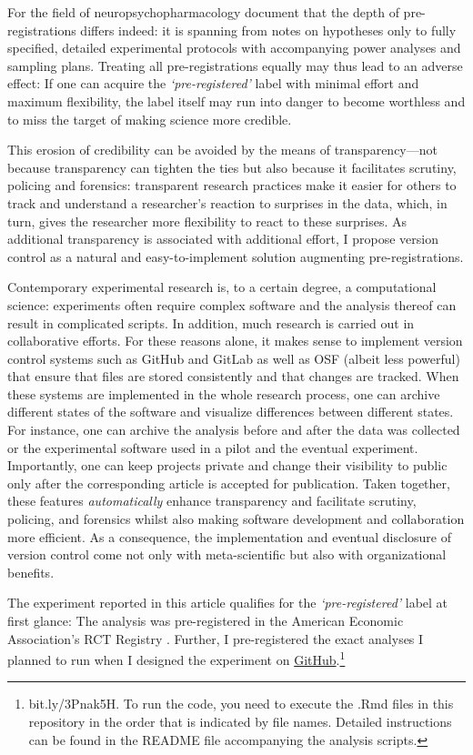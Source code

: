 \documentclass[
  authoryear,
  review,
  3p,
  onecolumn]{elsarticle}
\begin{document}
For the field of neuropsychopharmacology \citet{WaldronAllen2022}
document that the depth of pre-registrations differs indeed: it is
spanning from notes on hypotheses only to fully specified, detailed
experimental protocols with accompanying power analyses and sampling
plans. Treating all pre-registrations equally may thus lead to an
adverse effect: If one can acquire the \emph{`pre-registered'} label
with minimal effort and maximum flexibility, the label itself may run
into danger to become worthless and to miss the target of making science
more credible.

This erosion of credibility can be avoided by the means of
transparency---not because transparency can tighten the ties but also
because it facilitates scrutiny, policing
\citep[see][]{AnkelPetersFialaNeubauer2023} and forensics: transparent
research practices make it easier for others to track and understand a
researcher's reaction to surprises in the data, which, in turn, gives
the researcher more flexibility to react to these surprises. As
additional transparency is associated with additional effort, I propose
version control as a natural and easy-to-implement solution augmenting
pre-registrations.

Contemporary experimental research is, to a certain degree, a
computational science: experiments often require complex software and
the analysis thereof can result in complicated scripts. In addition,
much research is carried out in collaborative efforts. For these reasons
alone, it makes sense to implement version control systems such as
GitHub and GitLab as well as OSF (albeit less powerful) that ensure that
files are stored consistently and that changes are tracked. When these
systems are implemented in the whole research process, one can archive
different states of the software and visualize differences between
different states. For instance, one can archive the analysis before and
after the data was collected or the experimental software used in a
pilot and the eventual experiment. Importantly, one can keep projects
private and change their visibility to public only after the
corresponding article is accepted for publication. Taken together, these
features \emph{automatically} enhance transparency and facilitate
scrutiny, policing, and forensics whilst also making software
development and collaboration more efficient. As a consequence, the
implementation and eventual disclosure of version control come not only
with meta-scientific but also with organizational benefits.

The experiment reported in this article qualifies for the
\emph{`pre-registered'} label at first glance: The analysis was
pre-registered in the American Economic Association's RCT Registry
\citep{preregistration}. Further, I pre-registered the exact analyses I
planned to run when I designed the experiment on
\href{https://github.com/Howquez/GMTV/tree/July21Replication/analysis/R}{GitHub}.\footnote{bit.ly/3Pnak5H.
  To run the code, you need to execute the .Rmd files in this repository
  in the order that is indicated by file names. Detailed instructions
  can be found in the README file accompanying the analysis scripts.}
\end{document}

